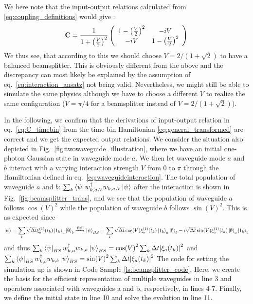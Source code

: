 We here note that the input-output relations calculated from \eqref{eq:coupling_definitions} would give \cite{Joanesarson2020Few-photonGeometries}:
\begin{equation}
    \textbf{\textbf{C}} = \frac{1}{1+\left(\frac{V}{2}\right)^2}\left(\begin{array}{cc}
1-\left(\frac{V}{2}\right)^2 & -i V \\
-i V & 1-\left(\frac{V}{2}\right)^2
\end{array}\right)
\end{equation}
We thus see, that according to this we should choose $V =  2/(1+\sqrt{2})$ to have a balanced beamsplitter. This is obviously different from the above and the discrepancy can most likely be explained by the assumption of eq.~\eqref{eq:interaction_ansatz} not being valid.  Nevertheless, we might still be able to simulate the same physics although we have to choose a different $V$ to realize the same configuration ($V=\pi/4$ for a beamsplitter instead of $V =  2/(1+\sqrt{2})$).

In the following, we confirm that the derivations of input-output relation in eq.~\eqref{eq:C_timebin} from the time-bin Hamiltonian \eqref{eq:general_transformed} are correct and we get the expected output relations. We consider the situation also depicted in Fig.~\ref{fig:twowaveguide_illustration}, where we have an initial one-photon Gaussian state in waveguide mode $a$. We then let waveguide mode $a$ and $b$ interact with a varying interaction strength $V$ from $0$ to $\pi$ through the Hamiltonian defined in eq.~\eqref{eq:waveguideinteraction}. The total population of waveguide $a$ and $b$: $\sum_k \bra{\psi} w_{k,a/b}^\dagger w_{k,a/b} \ket{\psi} $ after the interaction is shown in Fig.~\ref{fig:beamsplitter_trans}, and we see that the population of waveguide $a$ follows $\cos(V)^2$ while the population of waveguide $b$ follows $\sin(V)^2$. This is as expected since
\begin{equation}
    \ket{\psi} = \sum_k \sqrt{\Delta t} \xi_a^{(1)}(t_k) \ket{1_k}_a\ket{\emptyset}_b \xrightarrow{BS} \ket{\psi}_{BS} = \sum_k \sqrt{\Delta t} \cos(V) \xi_a^{(1)}(t_k) \ket{1_k}_a\ket{\emptyset}_b - i \sqrt{\Delta t} \sin(V) \xi_a^{(1)}(t_k) \ket{\emptyset}_a\ket{1_k}_b    
\end{equation}
and thus $\sum_k 
\bra{\psi}_{BS} w_{k,a}^\dagger w_{k,a} \ket{\psi}_{BS} = \cos(V)^2 \sum_k \Delta t\abs{\xi_a(t_k)}^2 $ and $\sum_k 
\bra{\psi}_{BS} w_{k,b}^\dagger w_{k,b} \ket{\psi}_{BS} = \sin(V)^2 \sum_k \Delta t \abs{\xi_a(t_k)}^2 $
The code for setting the simulation up is shown in Code Sample \ref{ls:beamsplitter_code}. Here, we create the basis for the efficient representation of multiple waveguides in line 3 and operators associated with waveguides a and b, respectively, in lines 4-7. Finally, we define the initial state in line 10 and solve the evolution in line 11. 

